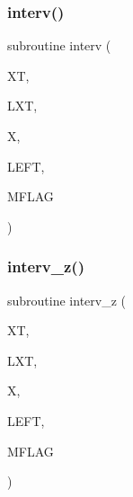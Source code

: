 \mbox{\label{Leroi__c_8f90_ab3d44a77ee1868f9a09dcac7e6bfcdce}} 
\subsubsection{\texorpdfstring{interv()}{interv()}}
{\footnotesize\ttfamily subroutine interv (\begin{DoxyParamCaption}\item[{real, dimension(lxt)}]{XT,  }\item[{integer}]{L\+XT,  }\item[{real}]{X,  }\item[{integer}]{L\+E\+FT,  }\item[{integer}]{M\+F\+L\+AG }\end{DoxyParamCaption})}

\mbox{\label{Leroi__c_8f90_a94be7a783132491a0e0694c462d979b5}} 
\subsubsection{\texorpdfstring{interv\+\_\+z()}{interv\_z()}}
{\footnotesize\ttfamily subroutine interv\+\_\+z (\begin{DoxyParamCaption}\item[{real, dimension(lxt)}]{XT,  }\item[{integer}]{L\+XT,  }\item[{real}]{X,  }\item[{integer}]{L\+E\+FT,  }\item[{integer}]{M\+F\+L\+AG }\end{DoxyParamCaption})}

\mbox{\label{Leroi__c_8f90_ad3c98b0aa8032dd5e2c3fce9417d4512}} 
